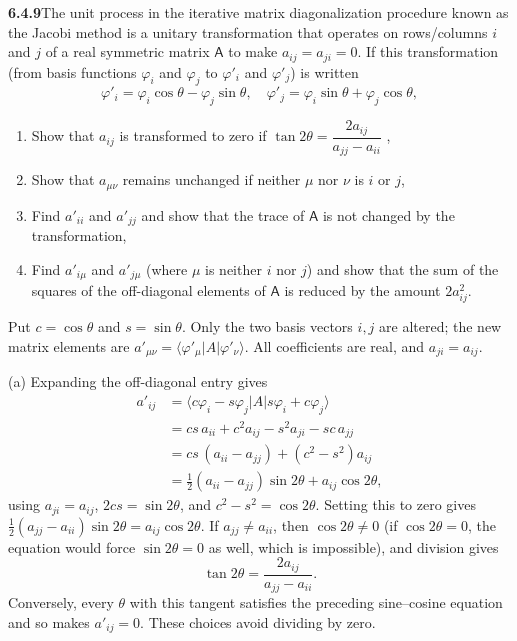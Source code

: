 \par\bigskip
\noindent\textbf{6.4.9}\quad The unit process in the iterative matrix
diagonalization procedure known as the Jacobi method is a unitary
transformation that operates on rows/columns $i$ and $j$ of a real symmetric
matrix $\mathsf{A}$ to make $a_{ij}=a_{ji}=0$. If this transformation (from
basis functions $\varphi_{i}$ and $\varphi_{j}$ to $\varphi'_{i}$ and
$\varphi'_{j}$) is written
\[
\varphi'_{i}=\varphi_{i}\cos\theta-\varphi_{j}\sin\theta,\quad
\varphi'_{j}=\varphi_{i}\sin\theta+\varphi_{j}\cos\theta,
\]
\begin{enumerate}
\item[(a)] Show that $a_{ij}$ is transformed to zero if
  $\tan2\theta=\dfrac{2a_{ij}}{a_{jj}-a_{ii}}$
  ,
\item[(b)] Show that $a_{\mu\nu}$ remains unchanged if neither $\mu$ nor $\nu$
  is $i$ or $j$,
\item[(c)] Find $a'_{ii}$ and $a'_{jj}$ and show that the trace of
  $\mathsf{A}$ is not changed by the transformation,
\item[(d)] Find $a'_{i\mu}$ and $a'_{j\mu}$ (where $\mu$ is neither $i$ nor
  $j$) and show that the sum of the squares of the off-diagonal elements of
  $\mathsf{A}$ is reduced by the amount $2a_{ij}^{2}$.
\end{enumerate}
\solution
Put $c=\cos\theta$ and $s=\sin\theta$. Only the two basis vectors
$i,j$ are altered; the new matrix elements are
$a'_{\mu\nu}=\langle\varphi'_\mu|A|\varphi'_\nu\rangle$.
All coefficients are real, and $a_{ji}=a_{ij}$.

(a) Expanding the off-diagonal entry gives
\begin{align*}
a'_{ij}
&=\langle c\varphi_i-s\varphi_j|A|s\varphi_i+c\varphi_j\rangle\\
&=cs\,a_{ii}+c^2a_{ij}-s^2a_{ji}-sc\,a_{jj}\\
&=cs\,(a_{ii}-a_{jj})+(c^2-s^2)a_{ij}\\
&=\frac12(a_{ii}-a_{jj})\sin2\theta+a_{ij}\cos2\theta,
\end{align*}
using $a_{ji}=a_{ij}$, $2cs=\sin2\theta$, and $c^2-s^2=\cos2\theta$.
Setting this to zero gives
$\frac12(a_{jj}-a_{ii})\sin2\theta=a_{ij}\cos2\theta$. If
$a_{jj}\ne a_{ii}$, then $\cos2\theta\ne0$ (if $\cos2\theta=0$, the
equation would force $\sin2\theta=0$ as well, which is impossible),
and division gives
\[
\boxed{\tan2\theta=\frac{2a_{ij}}{a_{jj}-a_{ii}}}.
\]
Conversely, every $\theta$ with this tangent satisfies the preceding
sine--cosine equation and so makes $a'_{ij}=0$.
These choices avoid dividing by zero.

